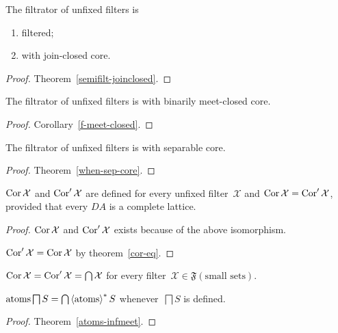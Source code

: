 \begin{prop}
The filtrator of unfixed filters is
\begin{enumerate}
\item filtered;
\item with join-closed core.
\end{enumerate}
\end{prop}

\begin{proof}
Theorem~\ref{semifilt-joinclosed}.
\end{proof}

\begin{prop}
The filtrator of unfixed filters is with binarily meet-closed core.
\end{prop}

\begin{proof}
Corollary~\ref{f-meet-closed}.
\end{proof}

\begin{prop}
The filtrator of unfixed filters is with separable core.
\end{prop}

\begin{proof}
Theorem~\ref{when-sep-core}.
\end{proof}

\begin{prop}
$\operatorname{Cor}\mathcal{X}$ and $\operatorname{Cor}'\mathcal{X}$ are defined for every
unfixed filter~$\mathcal{X}$ and
$\operatorname{Cor}\mathcal{X}=\operatorname{Cor}'\mathcal{X}$, provided that every
$DA$ is a complete lattice.
\end{prop}

\begin{proof}
$\operatorname{Cor}\mathcal{X}$ and $\operatorname{Cor}'\mathcal{X}$ exists because
of the above isomorphism.

$\operatorname{Cor}'\mathcal{X}=\operatorname{Cor}\mathcal{X}$ by
theorem~\ref{cor-eq}.
\end{proof}

\begin{obvious}
$\operatorname{Cor}\mathcal{X}=\operatorname{Cor}'\mathcal{X}=\bigcap\mathcal{X}$ for
every filter~$\mathcal{X}\in\mathfrak{F}(\text{small sets})$.
\end{obvious}

\begin{prop}
$\operatorname{atoms}\bigsqcap S=\bigcap\left\langle \operatorname{atoms}\right\rangle ^{\ast}S$
whenever~$\bigsqcap S$ is defined.
\end{prop}

\begin{proof}
Theorem~\ref{atoms-infmeet}.
\end{proof}

